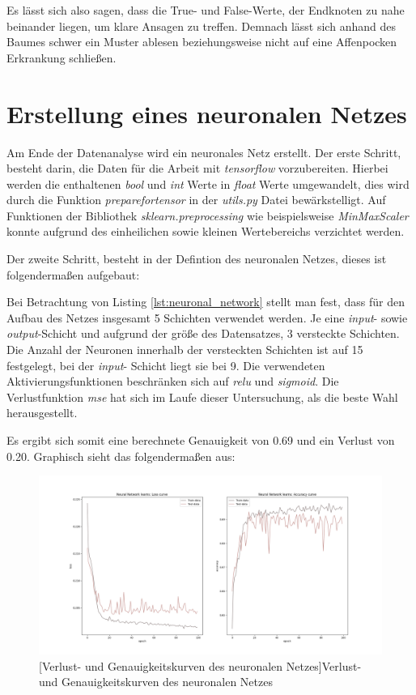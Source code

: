 \documentclass[13pt,a4paper, listof=entryprefix, bibliography=totocnumbered,toc=listofnumbered,lof=listofnumbered]{scrartcl}
\begin{document}
Es lässt sich also sagen, dass die True- und False-Werte, der Endknoten zu nahe beinander liegen, um klare Ansagen zu treffen. 
Demnach lässt sich anhand des Baumes schwer ein Muster ablesen beziehungsweise nicht auf eine Affenpocken Erkrankung schließen.  

	\section{Erstellung eines neuronalen Netzes}
		\label{ch:neuronlaes_netz}

Am Ende der Datenanalyse wird ein neuronales Netz erstellt. Der erste Schritt, besteht darin, die Daten für die Arbeit mit 
\textit{tensorflow} vorzubereiten. Hierbei werden die enthaltenen \textit{bool} und \textit{int} Werte in 
\textit{float} Werte umgewandelt, dies wird durch die Funktion \textit{prepare\textunderscore for\textunderscore tensor}
in der \textit{utils.py} Datei bewärkstelligt. Auf Funktionen der Bibliothek \textit{sklearn.preprocessing} wie 
beispielsweise \textit{MinMaxScaler} konnte aufgrund des einheilichen sowie kleinen Wertebereichs verzichtet werden. 

Der zweite Schritt, besteht in der Defintion des neuronalen Netzes, dieses ist folgendermaßen aufgebaut:



Bei Betrachtung von Listing \ref{lst:neuronal_network} stellt man fest, dass für den Aufbau des Netzes insgesamt 5
Schichten verwendet werden. Je eine \textit{input}- sowie \textit{output}-Schicht und aufgrund der 
größe des Datensatzes, 3 versteckte Schichten.
Die Anzahl der Neuronen innerhalb der versteckten Schichten ist auf 15 festgelegt, bei der \textit{input}-
Schicht liegt sie bei 9. Die verwendeten Aktivierungsfunktionen beschränken sich auf \textit{relu} und 
\textit{sigmoid}. Die Verlustfunktion \textit{mse} hat sich im Laufe dieser Untersuchung, als die beste Wahl herausgestellt.

Es ergibt sich somit eine berechnete Genauigkeit von 0.69 und ein Verlust von 0.20. Graphisch sieht das 
folgendermaßen aus: 

	\begin{figure}[H]
		\centering
		\includegraphics[width=0.8\linewidth]{Bilder/neural_network.png}
		[Verlust- und Genauigkeitskurven des neuronalen Netzes]{Verlust- und Genauigkeitskurven des neuronalen Netzes}
		\label{fig:neural_network}
	\end{figure}
\end{document}
